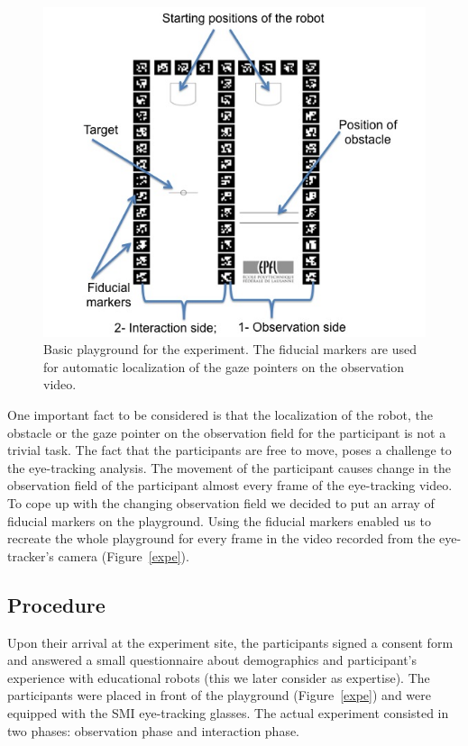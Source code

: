 \documentclass{sig-alternate}
\begin{document}
\begin{figure}
    \centering
    \includegraphics[width=0.9\linewidth]{playground}
    \caption{\small Basic playground for the experiment. The fiducial markers
    are used for automatic localization of the gaze pointers on the observation
    video.}

    \label{playground}
\end{figure}

One important fact to be considered is that the localization of the
robot, the obstacle or the gaze pointer on the observation field for the
participant is not a trivial task. The fact that the participants are
free to move, poses a challenge to the eye-tracking analysis. The
movement of the participant causes change in the observation field of
the participant almost every frame of the eye-tracking video. To cope up
with the changing observation field we decided to put an array of
fiducial markers on the playground. Using the fiducial markers enabled
us to recreate the whole playground for every frame in the video
recorded from the eye-tracker's camera (Figure~\ref{expe}).

\subsection{Procedure}

Upon their arrival at the experiment site, the participants signed a
consent form and answered a small questionnaire about demographics and
participant's experience with educational robots (this we later consider
as expertise). The participants were placed in front of the playground
(Figure~\ref{expe}) and were equipped with the SMI eye-tracking glasses. The
actual experiment consisted in two phases: observation phase and
interaction phase.
\end{document}
